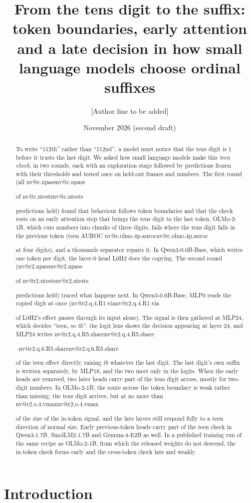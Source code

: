 \documentclass[11pt]{article}
\title{\textbf{From the tens digit to the suffix: token boundaries, early attention\\ and a late decision in how small language models choose ordinal suffixes}}
\author{[Author line to be added]}
\date{\vspace{-1.5em}November 2026 (second draft)}
\makeatletter
\newcommand{\nv}[1]{\ifcsname nv@#1\endcsname\csname nv@#1\endcsname\else\PackageError{numbers}{Unknown number key #1}{}\fi}
\newcommand{\qw}{Qwen3-0.6B-Base}
\newcommand{\ol}{OLMo-2-1B}
\newcommand{\mlp}[1]{MLP#1}
\newcommand{\hd}[2]{L#1H#2}
\newcommand{\sfx}[1]{\textit{#1}}
\makeatother
\begin{document}
\maketitle
\vspace{-2em}

\begin{abstract}
\noindent
To write ``112th'' rather than ``112nd'', a model must notice that the tens digit is 1 before it trusts the last digit. We asked how small language models make this \emph{teen check}, in two rounds, each with an exploration stage followed by predictions frozen with their thresholds and tested once on held-out frames and numbers. The first round (all \nv{c.npass} of \nv{c.ntests} predictions held) found that behaviour follows token boundaries and that the check rests on an early attention step that brings the tens digit to the last token. \ol{}, which cuts numbers into chunks of three digits, fails where the tens digit falls in the previous token (teen AUROC \nv{c.olmo.4p.auroc} at four digits), and a thousands separator repairs it. In \qw{}, which writes one token per digit, the layer-0 head \hd{0}{2} does the copying. The second round (\nv{r2.npass} of \nv{r2.ntests} predictions held) traced what happens next. In \qw{}, \mlp{0} reads the copied digit at once (\nv{r2.q.4.R1.via} of \hd{0}{2}'s effect passes through its input alone). The signal is then gathered at \mlp{24}, which decides ``teen, so \sfx{th}'': the logit lens shows the decision appearing at layer 24, and \mlp{24} writes \nv{r2.q.4.R5.share}--\nv{r2.q.6.R5.share} of the teen effect directly, raising \sfx{th} whatever the last digit. The last digit's own suffix is written separately, by \mlp{18}, and the two meet only in the logits. When the early heads are removed, two later heads carry part of the tens digit across, mostly for two-digit numbers. In \ol{}, the route across the token boundary is weak rather than missing: the tens digit arrives, but at no more than \nv{r2.o.4.vmax} of the size of the in-token signal, and the late layers still respond fully to a teen direction of normal size. Early previous-token heads carry part of the teen check in Qwen3-1.7B, SmolLM2-1.7B and Gemma-4-E2B as well. In a published training run of the same recipe as \ol{}, from which the released weights do not descend, the in-token check forms early and the cross-token check late and weakly.
\end{abstract}

\section{Introduction}
\label{sec:intro}
\end{document}
